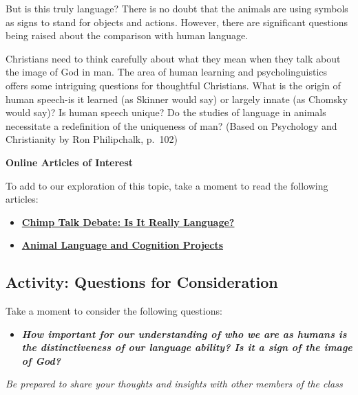 \documentclass[
]{book}
\providecommand{\tightlist}{%
  \setlength{\itemsep}{0pt}\setlength{\parskip}{0pt}}
\begin{document}
But is this truly language? There is no doubt that the animals are using symbols as signs to stand for objects and actions. However, there are significant questions being raised about the comparison with human language.

Christians need to think carefully about what they mean when they talk about the image of God in man. The area of human learning and psycholinguistics offers some intriguing questions for thoughtful Christians. What is the origin of human speech-is it learned (as Skinner would say) or largely innate (as Chomsky would say)? Is human speech unique? Do the studies of language in animals necessitate a redefinition of the uniqueness of man? (Based on Psychology and Christianity by Ron Philipchalk, p.~102)

\begin{caution}
\textbf{Online Articles of Interest}

To add to our exploration of this topic, take a moment to read the following articles:

\begin{itemize}
\item
  \href{http://tuvalu.santafe.edu/~johnson/articles.chimp.html}{\textbf{Chimp Talk Debate: Is It Really Language?}}
\item
  \href{https://www.massey.ac.nz/~alock/hbook/ristau.htm}{\textbf{Animal Language and Cognition Projects}}
\end{itemize}
\end{caution}

\hypertarget{activity-questions-for-consideration-2}{%
\subsection*{Activity: Questions for Consideration}\label{activity-questions-for-consideration-2}}

\begin{reflect}
Take a moment to consider the following questions:

\begin{itemize}
\tightlist
\item
  \textbf{\emph{How important for our understanding of who we are as humans is the distinctiveness of our language ability? Is it a sign of the image of God?}}
\end{itemize}

\emph{Be prepared to share your thoughts and insights with other members of the class}
\end{reflect}
\end{document}
